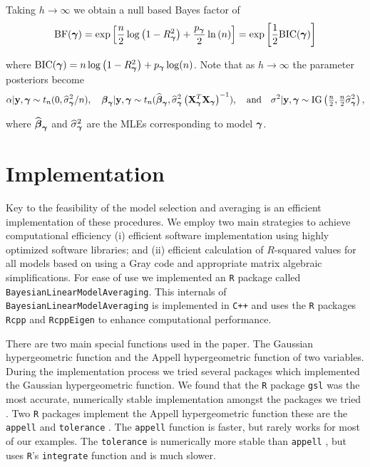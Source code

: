 \documentclass{article}[12pt]
\begin{document}
\noindent Taking $h\to\infty$ we obtain a null based Bayes factor of
$$
\displaystyle \mbox{BF}({\boldsymbol \gamma})
=
\exp\left[
\frac{n}{2}\log\left( 1 - R_{\boldsymbol \gamma}^2 \right) 
+ \frac{p_{\boldsymbol \gamma}}{2}\ln\left(n \right)
\right] = \exp\left[ \frac{1}{2}\mbox{BIC}({\boldsymbol \gamma})\right]
$$

\noindent where $\mbox{BIC}({\boldsymbol \gamma}) = n\log\left( 1 - R_{\boldsymbol \gamma}^2 \right) + p_{\boldsymbol \gamma} \log(n)$. Note that as $h\to\infty$ the parameter posteriors become
$$\alpha|{\bf y},{\boldsymbol \gamma} \sim t_n(0,\widehat{\sigma}_{{\boldsymbol \gamma}}^2/n), \quad
{\boldsymbol\beta}_{{\boldsymbol \gamma}}|{\bf y},{\boldsymbol \gamma} \sim t_n( \widehat{{\boldsymbol \beta}}_{{\boldsymbol \gamma}}, \widehat{\sigma}_{{\boldsymbol \gamma}}^2 \left({\bf X}_{\boldsymbol \gamma}^T{\bf X}_{\boldsymbol \gamma}  \right)^{-1} ),
\quad \mbox{and} \quad  
\sigma^2|{\bf y},{\boldsymbol \gamma} \sim \mbox{IG}\left( \tfrac{n}{2}, \tfrac{n}{2}\widehat{\sigma}_{{\boldsymbol \gamma}}^2 \right),
$$

\noindent 
where $\widehat{{\boldsymbol \beta}}_{{\boldsymbol \gamma}}$
and $\widehat{\sigma}_{{\boldsymbol \gamma}}^2$ are the
MLEs corresponding to model ${\boldsymbol \gamma}$.

 
\section{Implementation}
\label{sec:implementation}

Key to the feasibility of the model selection and averaging is an efficient implementation of these procedures. We employ two main 
strategies to achieve computational efficiency (i) efficient software implementation using
highly optimized software libraries; and (ii) efficient calculation of
$R$-squared values for all models based on using a Gray code and appropriate
matrix algebraic simplifications.
For ease of use we 
implemented an {\tt R} package called {\tt BayesianLinearModelAveraging}.
This internals of {\tt BayesianLinearModelAveraging} is implemented
in {\tt C++} and uses the {\tt R} packages \texttt{Rcpp} and \texttt{RcppEigen} to enhance
computational performance.  

There are two main special functions used in the paper. The 
Gaussian hypergeometric function and the Appell hypergeometric function
of two variables. During the 
implementation process we tried several packages which implemented the
Gaussian hypergeometric function.
We found that the {\tt R} package {\tt gsl} was the most accurate, numerically
stable implementation amongst the packages we tried
\citep{Hankin2006}. Two {\tt R} packages 
implement the Appell
hypergeometric function these are the
{\tt appell} \citep{Bove2013}
and {\tt tolerance} \citep{Young2010}. The 
{\tt appell} function is faster, but rarely works for most of our examples.
The {\tt tolerance} is numerically more stable than {\tt appell} , but uses {\tt R}'s {\tt integrate}
function and is much slower.
\end{document}
